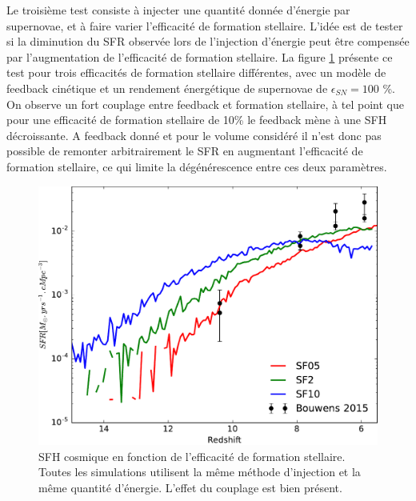 Le troisième test consiste à injecter une quantité donnée d'énergie par supernovae, et à faire varier l'efficacité de formation stellaire.
L'idée est de tester si la diminution du \ac{SFR} observée lors de l'injection d'énergie peut être compensée par l'augmentation de l'efficacité de formation stellaire.
La figure \ref{fig:sfr_sfe} présente ce test pour trois efficacités de formation stellaire différentes, avec un modèle de feedback cinétique et un rendement énergétique de supernovae de $\epsilon_{SN}=100$ \%.
On observe un fort couplage entre feedback et formation stellaire, à tel point que pour une efficacité de formation stellaire de 10\% le feedback mène à une \ac{SFH} décroissante.
A feedback donné et pour le volume considéré il n'est donc pas possible de remonter arbitrairement le \ac{SFR} en augmentant l'efficacité de formation stellaire, ce qui limite la dégénérescence entre ces deux paramètres.

\begin{figure}
        \includegraphics[width=.95\textwidth]{img/03/sedov/SFR_sfeff.pdf} 
        \caption[SFH cosmique en fonction de l'efficacité de formation stellaire]{SFH cosmique en fonction de l'efficacité de formation stellaire.
        Toutes les simulations utilisent la même méthode d'injection et la même quantité d'énergie.
		L'effet du couplage est bien présent.
        }
 		\label{fig:sfr_sfe}
\end{figure}





%
